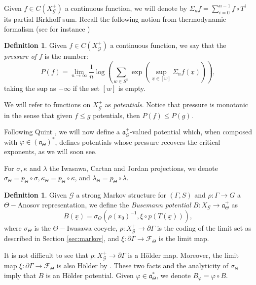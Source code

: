 \documentclass{amsart}
\theoremstyle{remark}
\theoremstyle{definition}
\newtheorem{defi}[thm]{Definition}
\begin{document}
Given $f \in C(X_\mathcal{G}^+)$ a continuous function, we will denote by $\Sigma_n f = \sum_{i=0}^{n-1} f \circ T^i$ its partial Birkhoff sum.
Recall the following notion from thermodynamic formalism (see for instance \cite{viana2016foundations})

\begin{defi}
   \label{def:pressure}
 Given $f \in C(X_\mathcal{G}^+)$ a continuous function, we say that the \emph{pressure of $f$} is the number:
   $$P(f) = \lim_{n \to \infty}\frac{1}{n} \log \left( \sum_{w \in S^n} \exp (\sup_{\underline{x} \in [w]}\Sigma_n f(\underline{x})) \right),$$
 taking the sup as $-\infty$ if the set $[w]$ is empty.
\end{defi}

We will refer to functions on $X_\mathcal{G}^+$ as \emph{potentials}.
Notice that pressure is monotonic in the sense that given $f \leq g$ potentials, then $P(f) \leq P(g)$.

Following Quint \cite{quint2003indicateur}, we will now define a $\mathfrak{a}_\Theta^+$-valued potential which, when composed with $\varphi \in (\mathfrak{a}_\Theta)^*$, defines potentials whose pressure recovers the critical exponents, as we will soon see.

For $\sigma, \kappa$ and $\lambda$ the Iwasawa, Cartan and Jordan projections, we denote $\sigma_\Theta = p_\Theta \circ \sigma, \kappa_\Theta = p_\Theta \circ \kappa$, and $\lambda_\Theta = p_\Theta \circ \lambda$. 

\begin{defi}
\label{defi:busemannpotential}
 Given $\mathcal{G}$ a strong Markov structure for $(\Gamma,S)$ and $\rho : \Gamma \rightarrow G$ a $\Theta-$Anosov representation, we define the \emph{Busemann potential} $B: X_\mathcal{G} \rightarrow \mathfrak{a}_\Theta^+$ as
 $$B (\underline{x}) = \sigma_\Theta(\rho (x_0)^{-1}, \xi \circ p (T (\underline{x}))),$$
 where $\sigma_\Theta$ is the $\Theta-$Iwasawa cocycle, $p: X_\mathcal{G}^+ \rightarrow \partial \Gamma$ is the coding of the limit set as described in Section \ref{sec:markov}, and $\xi :\partial \Gamma \rightarrow \mathcal{F}_\Theta$ is the limit map.
\end{defi}


It is not difficult to see that $p: X_\mathcal{G}^+ \rightarrow \partial \Gamma$ is a H\"older map.
Moreover, the limit map $\xi : \partial \Gamma \rightarrow \mathcal{F}_\Theta$ is also H\"older by \cite[Theorem A.15]{bochi2019anosov}.
These two facts and the analyticity of $\sigma_\Theta$ imply that $B$ is an H\"older potential. Given $\varphi \in \mathfrak{a}_\Theta^*$, we denote $B_\varphi = \varphi \circ B$.
\end{document}
